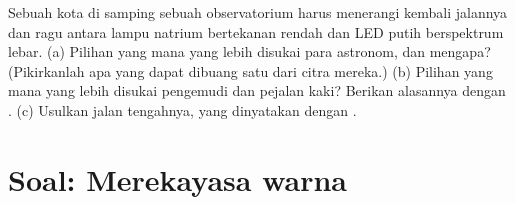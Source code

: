 \begin{exercise}[$\star\star\star$]\label{exo:g11:color-light-sources:15}
Sebuah kota di samping sebuah observatorium harus menerangi kembali
jalannya dan ragu antara lampu natrium bertekanan rendah dan LED putih
berspektrum lebar. (a) Pilihan yang mana yang lebih disukai para
astronom, dan mengapa? (Pikirkanlah apa yang dapat dibuang satu 
dari citra mereka.) (b) Pilihan yang mana yang lebih disukai pengemudi
dan pejalan kaki? Berikan alasannya dengan . (c) Usulkan
jalan tengahnya, yang dinyatakan dengan .
\end{exercise}

\section{Soal: Merekayasa warna}

